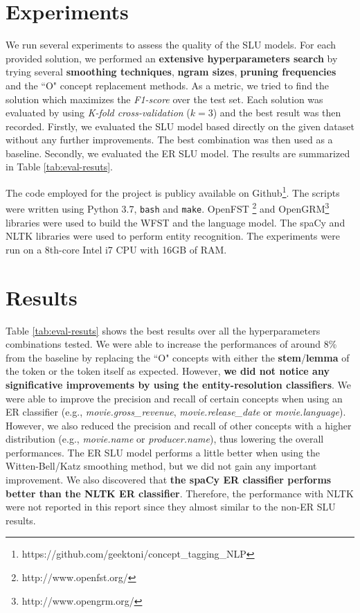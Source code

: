 \documentclass[11pt,a4paper]{article}
\begin{document}
\section{Experiments}

We run several experiments to assess the quality of 
the SLU models. For each provided solution, we performed an \textbf{extensive hyperparameters search} by trying several \textbf{smoothing techniques}, \textbf{ngram sizes}, \textbf{pruning frequencies} and the ``O" concept replacement methods. As a metric, we tried to find the solution which maximizes the \textit{F1-score} over the test set. Each solution was evaluated by using \textit{K-fold cross-validation} ($k=3$) and the best result was then recorded. Firstly, we evaluated the SLU model based directly on the given dataset without any further improvements. The best combination was then used as a baseline. Secondly, we evaluated the ER SLU model. The results are summarized in Table \ref{tab:eval-resuts}.

The code employed for the project is publicy available on Github\footnote{https://github.com/geektoni/concept\_tagging\_NLP}. The scripts were written using Python 3.7, \texttt{bash} and \texttt{make}. OpenFST \footnote{http://www.openfst.org/} and OpenGRM\footnote{http://www.opengrm.org/} libraries were used to build the WFST and the language model. The spaCy and NLTK libraries were used to perform entity recognition.
The experiments were run on a 8th-core Intel i7 CPU with 16GB of RAM. 



\section{Results}

Table \ref{tab:eval-resuts} shows the best results over all the hyperparameters combinations tested. We were able to increase the performances of around 8\% from the baseline by replacing the ``O" concepts with either the \textbf{stem}/\textbf{lemma} of the token or the token itself as expected.
However, \textbf{we did not notice any significative improvements by using the entity-resolution classifiers}. We were able to improve the precision and recall of certain concepts when using an ER classifier (e.g., \textit{movie.gross\_revenue}, \textit{movie.release\_date} or \textit{movie.language}).
However, we also reduced the precision and recall of other concepts with a higher distribution (e.g., \textit{movie.name} or \textit{producer.name}), thus lowering the overall performances. The ER SLU model performs a little better when using the Witten-Bell/Katz smoothing method, but we did not gain any important improvement. We also discovered that \textbf{the spaCy ER classifier performs better than the NLTK ER classifier}. 
Therefore, the performance with NLTK were not reported in this report since they almost similar to the non-ER SLU results.
 
\end{document}
